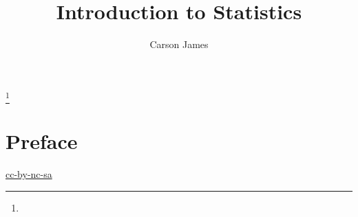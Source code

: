 \documentclass{book}
\begin{document}
	
	\frontmatter
	
	\title{Introduction to Statistics}
	
	
	\author{Carson James}
	\thanks{}
	
	\date{}
	
	\maketitle
	
	
	\setcounter{page}{4}
	
	\tableofcontents
	\printunsrtglossary[type=symbols,style=long,title={Notation}]
	
	
	\mainmatter
	
	\chapter*{Preface}
	
	\begin{flushleft}
		\href{https://creativecommons.org/licenses/by-nc-sa/4.0/legalcode.txt}{cc-by-nc-sa}
	\end{flushleft}
\end{document}
